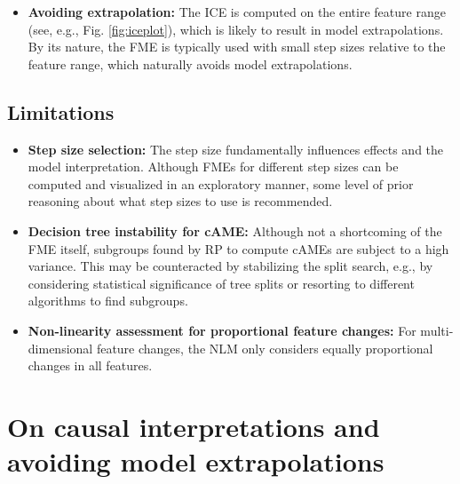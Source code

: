 \begin{itemize}
    \item \textbf{Avoiding extrapolation:} The ICE is computed on the entire feature range (see, e.g., Fig. \ref{fig:iceplot}), which is likely to result in model extrapolations. By its nature, the FME is typically used with small step sizes relative to the feature range, which naturally avoids model extrapolations.
\end{itemize}

\subsection{Limitations}

\begin{itemize}
    \item \textbf{Step size selection:} The step size fundamentally influences effects and the model interpretation. Although FMEs for different step sizes can be computed and visualized in an exploratory manner, some level of prior reasoning about what step sizes to use is recommended.
    \item \textbf{Decision tree instability for cAME:} Although not a shortcoming of the FME itself, subgroups found by RP to compute cAMEs are subject to a high variance. This may be counteracted by stabilizing the split search, e.g., by considering statistical significance of tree splits or resorting to different algorithms to find subgroups.
    \item \textbf{Non-linearity assessment for proportional feature changes:} For multi-dimensional feature changes, the NLM only considers equally proportional changes in all features.
\end{itemize}

\section{On causal interpretations and avoiding model extrapolations}


\label{sec:causality_extrapolations}

